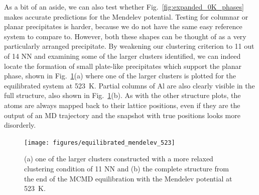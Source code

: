 As a bit of an aside, we can also test whether Fig.~\ref{fig:expanded_0K_phases} makes accurate predictions for the Mendelev potential.
Testing for columnar or planar precipitates is harder, because we do not have the same easy reference system to compare to.
However, both these shapes can be thought of as a very particularly arranged \BTWO precipitate.
By weakening our clustering criterion to 11 out of 14 NN and examining some of the larger \BTWO clusters identified, we can indeed locate the formation of small plate-like precipitates which support the planar phase, shown in Fig.~\ref{fig:mendelev_structure}(a) where one of the larger clusters is plotted for the equilibrated system at 523~K.
Partial columns of Al are also clearly visible in the full structure, also shown in Fig.~\ref{fig:mendelev_structure}(b).
As with the other structure plots, the atoms are always mapped back to their lattice positions, even if they are the output of an MD trajectory and the snapshot with true positions looks more disorderly.
%
\begin{figure}[h]
    \centering
    \texttt{[image: figures/equilibrated\_mendelev\_523]}
    \caption{(a) one of the larger \BTWO clusters constructed with a more relaxed clustering condition of 11 NN and (b) the complete structure from the end of the MCMD equilibration with the Mendelev potential at 523~K.}
    \label{fig:mendelev_structure}
\end{figure}